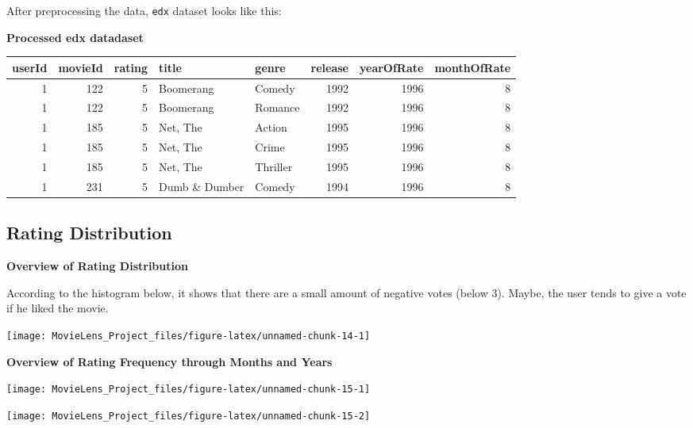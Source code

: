 \documentclass[]{article}
\begin{document}
After preprocessing the data, \texttt{edx} dataset looks like this:

\textbf{Processed edx datadaset}

\begin{table}[H]
\centering\begingroup\fontsize{10}{12}\selectfont

\begin{tabular}{r|r|r|l|l|r|r|r}
\hline
userId & movieId & rating & title & genre & release & yearOfRate & monthOfRate\\
\hline
1 & 122 & 5 & Boomerang & Comedy & 1992 & 1996 & 8\\
\hline
1 & 122 & 5 & Boomerang & Romance & 1992 & 1996 & 8\\
\hline
1 & 185 & 5 & Net, The & Action & 1995 & 1996 & 8\\
\hline
1 & 185 & 5 & Net, The & Crime & 1995 & 1996 & 8\\
\hline
1 & 185 & 5 & Net, The & Thriller & 1995 & 1996 & 8\\
\hline
1 & 231 & 5 & Dumb \& Dumber & Comedy & 1994 & 1996 & 8\\
\hline
\end{tabular}
\endgroup{}
\end{table}

\newpage

\hypertarget{rating-distribution}{%
\subsection{Rating Distribution}\label{rating-distribution}}

\textbf{Overview of Rating Distribution}

According to the histogram below, it shows that there are a small amount
of negative votes (below 3). Maybe, the user tends to give a vote if he
liked the movie.

\begin{center}\texttt{[image: MovieLens\_Project\_files/figure-latex/unnamed-chunk-14-1]} \end{center}

\textbf{Overview of Rating Frequency through Months and Years}

\begin{center}\texttt{[image: MovieLens\_Project\_files/figure-latex/unnamed-chunk-15-1]} \end{center}

\begin{center}\texttt{[image: MovieLens\_Project\_files/figure-latex/unnamed-chunk-15-2]} \end{center}
\end{document}
